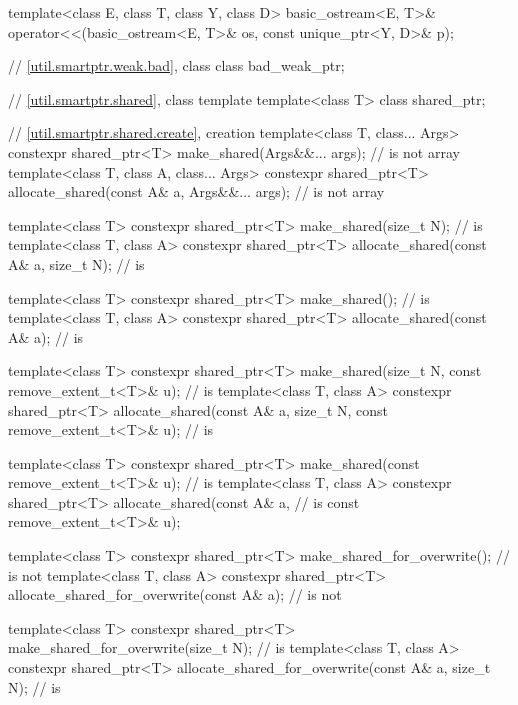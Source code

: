 \begin{codeblock}
{  template<class E, class T, class Y, class D>
    basic_ostream<E, T>& operator<<(basic_ostream<E, T>& os, const unique_ptr<Y, D>& p);

  // \ref{util.smartptr.weak.bad}, class 
  class bad_weak_ptr;

  // \ref{util.smartptr.shared}, class template 
  template<class T> class shared_ptr;

  // \ref{util.smartptr.shared.create},  creation
  template<class T, class... Args>
    constexpr shared_ptr<T> make_shared(Args&&... args);                        //  is not array
  template<class T, class A, class... Args>
    constexpr shared_ptr<T> allocate_shared(const A& a, Args&&... args);        //  is not array

  template<class T>
    constexpr shared_ptr<T> make_shared(size_t N);                                  //  is 
  template<class T, class A>
    constexpr shared_ptr<T> allocate_shared(const A& a, size_t N);                  //  is 

  template<class T>
    constexpr shared_ptr<T> make_shared();                                          //  is 
  template<class T, class A>
    constexpr shared_ptr<T> allocate_shared(const A& a);                            //  is 

  template<class T>
    constexpr shared_ptr<T> make_shared(size_t N, const remove_extent_t<T>& u);     //  is 
  template<class T, class A>
    constexpr shared_ptr<T> allocate_shared(const A& a, size_t N,
                                            const remove_extent_t<T>& u);           //  is 

  template<class T>
    constexpr shared_ptr<T> make_shared(const remove_extent_t<T>& u);               //  is 
  template<class T, class A>
    constexpr shared_ptr<T> allocate_shared(const A& a,                             //  is 
                                            const remove_extent_t<T>& u);

  template<class T>
    constexpr shared_ptr<T> make_shared_for_overwrite();                            //  is not 
  template<class T, class A>
    constexpr shared_ptr<T> allocate_shared_for_overwrite(const A& a);              //  is not 

  template<class T>
    constexpr shared_ptr<T> make_shared_for_overwrite(size_t N);                    //  is 
  template<class T, class A>
    constexpr shared_ptr<T> allocate_shared_for_overwrite(const A& a, size_t N);    //  is 

}
\end{codeblock}
